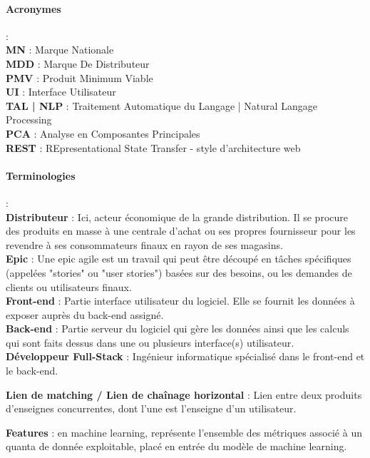 \documentclass{rapportCS}
\begin{document}
\paragraph*{Acronymes} : \\
  \textbf{MN} : Marque Nationale \\
  \textbf{MDD} : Marque De Distributeur\\
  \textbf{PMV} : Produit Minimum Viable\\
  \textbf{UI} : Interface Utilisateur\\
  \textbf{TAL | NLP} : Traitement Automatique du Langage | Natural Langage Processing\\
  \textbf{PCA} : Analyse en Composantes Principales\\
  \textbf{REST} : REpresentational State Transfer - style d'architecture web

\paragraph*{Terminologies} : \\
  
  \textbf{Distributeur} : Ici, acteur économique de la grande distribution. Il se procure des produits en masse à une centrale d'achat
  ou ses propres fournisseur pour les revendre à ses consommateurs finaux en rayon de ses magasins.\\
  
  \textbf{Epic} : Une epic agile est un travail qui peut être découpé en tâches spécifiques (appelées "stories" ou "user stories")
  basées sur des besoins, ou les demandes de clients ou utilisateurs finaux.\\

  \textbf{Front-end} : Partie interface utilisateur du logiciel. Elle se fournit les données à exposer auprès du back-end assigné.\\
  
  \textbf{Back-end} : Partie serveur du logiciel qui gère les données ainsi que les calculs qui sont faits dessus
  dans une ou plusieurs interface(s) utilisateur. \\

  \textbf{Développeur Full-Stack} : Ingénieur informatique spécialisé dans le front-end et le back-end.

  \textbf{Lien de matching / Lien de chaînage horizontal} : Lien entre deux produits d'enseignes concurrentes, dont l'une est l'enseigne d'un utilisateur. 

  \textbf{Features} : en machine learning, représente l'ensemble des métriques associé à un quanta
  de donnée exploitable, placé en entrée du modèle de machine learning.
\end{document}
